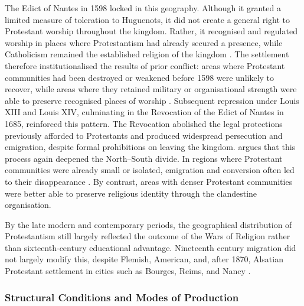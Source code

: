 \documentclass[12pt]{article}
\begin{document}
The Edict of Nantes in 1598 locked in this geography. Although it granted a limited measure of toleration to Huguenots, it did not create a general right to Protestant worship throughout the kingdom. Rather, it recognised and regulated worship in places where Protestantism had already secured a presence, while Catholicism remained the established religion of the kingdom \parencite{bostCarteProtestantismeFrancais1924, moursEglisesReformeesFrance1958}. The settlement therefore institutionalised the results of prior conflict: areas where Protestant communities had been destroyed or weakened before 1598 were unlikely to recover, while areas where they retained military or organisational strength were able to preserve recognised places of worship \parencite[p. 119]{benedictFaithFortunesFrances2001}. Subsequent repression under Louis XIII and Louis XIV, culminating in the Revocation of the Edict of Nantes in 1685, reinforced this pattern. The Revocation abolished the legal protections previously afforded to Protestants and produced widespread persecution and emigration, despite formal prohibitions on leaving the kingdom. \textcite{bostCarteProtestantismeFrancais1924} argues that this process again deepened the North--South divide. In regions where Protestant communities were already small or isolated, emigration and conversion often led to their disappearance \parencite{benedictFaithFortunesFrances2001, benedictPopulationReformeeFrancaise1987}. By contrast, areas with denser Protestant communities were better able to preserve religious identity through the clandestine organisation.

By the late modern and contemporary periods, the geographical distribution of Protestantism still largely reflected the outcome of the Wars of Religion rather than sixteenth-century educational advantage. Nineteenth century migration did not largely modify this, despite Flemish, American, and, after 1870, Alsatian Protestant settlement in cities such as Bourges, Reims, and Nancy \parencite{bostCarteProtestantismeFrancais1924}. 

\subsubsection{Structural Conditions and Modes of Production}
\end{document}
